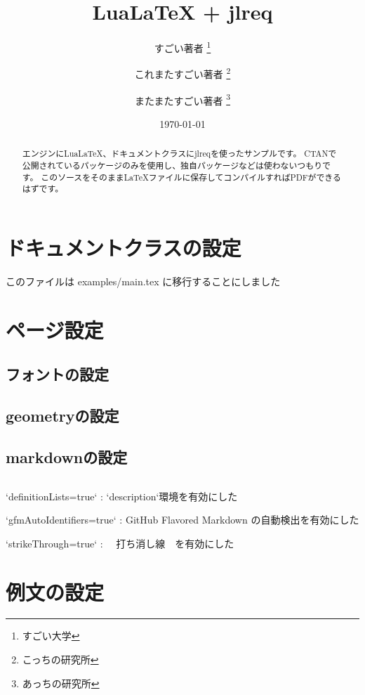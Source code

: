 \documentclass[
  article,
  head_space=25truemm,
  foot_space=10truemm,
gutter=15truemm]{jlreq}
\title{LuaLaTeX + jlreq}
\author{
  すごい著者 \thanks{すごい大学} \\ \and
  これまたすごい著者 \thanks{こっちの研究所} \\ \and
  またまたすごい著者 \thanks{あっちの研究所}
}
\date{\today}
\begin{document}
\maketitle

\begin{abstract}
  エンジンにLuaLaTeX、ドキュメントクラスにjlreqを使ったサンプルです。
  CTANで公開されているパッケージのみを使用し、独自パッケージなどは使わないつもりです。
  このソースをそのままLaTeXファイルに保存してコンパイルすればPDFができるはずです。
\end{abstract}

\tableofcontents

\section{ドキュメントクラスの設定}

このファイルは examples/main.tex に移行することにしました

\section{ページ設定}

\subsection{フォントの設定}

\subsection{geometryの設定}

\subsection{markdownの設定}

\inputminted{latex}{preamble/markdown.tex}

\begin{markdown}
  `definitionLists=true`
  : `description`環境を有効にした

  `gfmAutoIdentifiers=true`
  : GitHub Flavored Markdown の自動検出を有効にした

  `strikeThrough=true`
  : ~~打ち消し線~~を有効にした
\end{markdown}

\section{例文の設定}
\end{document}

